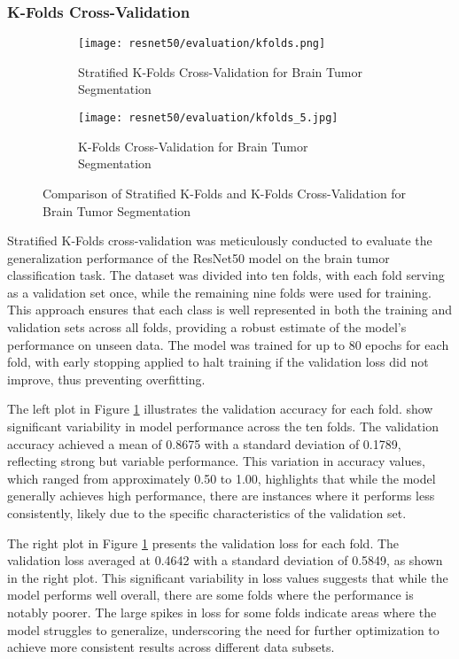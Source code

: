 \subsubsection{K-Folds Cross-Validation}

\begin{figure}[H]
  \centering
  \begin{subfigure}[b]{0.45\textwidth}
    \centering
    \texttt{[image: resnet50/evaluation/kfolds.png]}
    \caption{Stratified K-Folds Cross-Validation for Brain Tumor Segmentation}\label{f:resnet50_kfolds}
  \end{subfigure}
  \hfill
  \begin{subfigure}[b]{0.45\textwidth}
    \centering
    \texttt{[image: resnet50/evaluation/kfolds\_5.jpg]}
    \caption{K-Folds Cross-Validation for Brain Tumor Segmentation}\label{f:resnet50_kfolds_5}
  \end{subfigure}
  \caption{Comparison of Stratified K-Folds and K-Folds Cross-Validation for Brain Tumor Segmentation}\label{f:resnet50_kfolds_comparison}
\end{figure}

Stratified K-Folds cross-validation was meticulously conducted to evaluate the generalization performance of the ResNet50 model on the brain tumor classification task. The dataset was divided into ten folds, with each fold serving as a validation set once, while the remaining nine folds were used for training. This approach ensures that each class is well represented in both the training and validation sets across all folds, providing a robust estimate of the model's performance on unseen data. The model was trained for up to 80 epochs for each fold, with early stopping applied to halt training if the validation loss did not improve, thus preventing overfitting.

The left plot in Figure \ref{f:resnet50_kfolds} illustrates the validation accuracy for each fold. show significant variability in model performance across the ten folds. The validation accuracy achieved a mean of 0.8675 with a standard deviation of 0.1789, reflecting strong but variable performance. This variation in accuracy values, which ranged from approximately 0.50 to 1.00, highlights that while the model generally achieves high performance, there are instances where it performs less consistently, likely due to the specific characteristics of the validation set.

The right plot in Figure \ref{f:resnet50_kfolds} presents the validation loss for each fold. The validation loss averaged at 0.4642 with a standard deviation of 0.5849, as shown in the right plot. This significant variability in loss values suggests that while the model performs well overall, there are some folds where the performance is notably poorer. The large spikes in loss for some folds indicate areas where the model struggles to generalize, underscoring the need for further optimization to achieve more consistent results across different data subsets.


